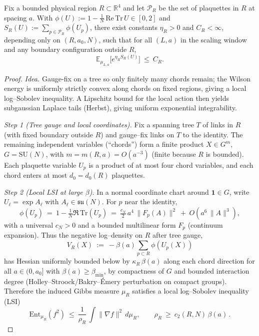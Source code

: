\documentclass[11pt]{amsart}
\begin{document}
\begin{theorem}\label{thm:uei-fixed-region}
Fix a bounded physical region $R\subset\mathbb{R}^4$ and let $\mathcal{P}_R$ be the set of plaquettes in $R$ at spacing $a$. With $\phi(U):=1-\tfrac{1}{N}\,\mathrm{Re\,Tr}\,U\in[0,2]$ and $S_R(U):=\sum_{p\in\mathcal{P}_R}\phi(U_p)$, there exist constants $\eta_R>0$ and $C_R<\infty$, depending only on $(R,a_0,N)$, such that for all $(L,a)$ in the scaling window and any boundary configuration outside $R$,
\[
  \mathbb{E}_{\mu_{L,a}}\big[e^{\eta_R S_R(U)}\big]\ \le\ C_R.
\]
\end{theorem}
\begin{proof}
\emph{Idea.} Gauge-fix on a tree so only finitely many chords remain; the Wilson energy is uniformly strictly convex along chords on fixed regions, giving a local log–Sobolev inequality. A Lipschitz bound for the local action then yields subgaussian Laplace tails (Herbst), giving uniform exponential integrability.

\medskip
\emph{Step 1 (Tree gauge and local coordinates).} Fix a spanning tree $T$ of links in $R$ (with fixed boundary outside $R$) and gauge--fix links on $T$ to the identity. The remaining independent variables (``chords'') form a finite product $X\in G^{m}$, $G=\mathrm{SU}(N)$, with $m=m(R,a)=O(a^{-3})$ (finite because $R$ is bounded). Each plaquette variable $U_p$ is a product of at most four chord variables, and each chord enters at most $d_0=d_0(R)$ plaquettes.

\emph{Step 2 (Local LSI at large $\beta$).} In a normal coordinate chart around $\mathbf{1}\in G$, write $U_\ell=\exp A_\ell$ with $A_\ell\in\mathfrak{su}(N)$. For $p$ near the identity,
\[
  \phi(U_p)\ =\ 1-\tfrac{1}{N}\Re\,\mathrm{Tr}(U_p)
  \ =\ \tfrac{c_N}{2}\,a^4\,\|F_p(A)\|^2\ +\ O(a^6\,\|A\|^3),
\]
with a universal $c_N>0$ and a bounded multilinear form $F_p$ (continuum expansion). Thus the negative log--density on $R$ after tree gauge,
\[
  V_R(X)\ :=\ -\beta(a)\sum_{p\subset R}\phi(U_p(X))
\]
has Hessian uniformly bounded below by $\kappa_R\,\beta(a)$ along each chord direction for all $a\in(0,a_0]$ with $\beta(a)\ge \beta_{\min}$, by compactness of $G$ and bounded interaction degree (Holley--Stroock/Bakry--\'Emery perturbation on compact groups). Therefore the induced Gibbs measure $\mu_R$ satisfies a local log--Sobolev inequality (LSI)
\[
  \mathrm{Ent}_{\mu_R}(f^2)\ \le\ \frac{1}{\rho_R}\,\int \|\nabla f\|^2\,d\mu_R,
  \qquad \rho_R\ \ge\ c_2(R,N)\,\beta(a)\,.
\]


\end{proof}
\end{document}
